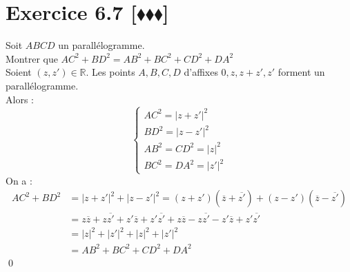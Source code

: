 \documentclass[10pt]{article}
\begin{document}
\section*{Exercice 6.7 [$\blacklozenge\blacklozenge\blacklozenge$]}
\begin{tcolorbox}[enhanced, width=7in, center, size=fbox, fontupper=\large, drop shadow southwest]
    Soit $ABCD$ un parallélogramme.\\
    Montrer que $AC^2+BD^2=AB^2+BC^2+CD^2+DA^2$\\
    Soient $(z,z')\in\mathbb{R}$. Les points $A,B,C,D$ d'affixes $0,z,z+z',z'$ forment un parallélogramme.\\
    Alors :
    \begin{equation*}
        \begin{cases}
            AC^2 = |z+z'|^2\\
            BD^2 = |z-z'|^2\\
            AB^2 = CD^2 = |z|^2\\
            BC^2 = DA^2 = |z'|^2
        \end{cases}
    \end{equation*}
    On a :
    \begin{align*}
        AC^2 + BD^2 &= |z+z'|^2 + |z-z'|^2 = (z+z')(\overline{z}+\overline{z'})+(z-z')(\overline{z}-\overline{z'})\\
        &=z\overline{z}+z\overline{z'}+z'\overline{z}+z'\overline{z'}+z\overline{z}-z\overline{z'}-z'\overline{z}+z'\overline{z'}\\
        &=|z|^2+|z'|^2+|z|^2+|z'|^2\\
        &= AB^2 + BC^2 + CD^2 + DA^2
    \end{align*}
    \qed
\end{tcolorbox}

\end{document}
